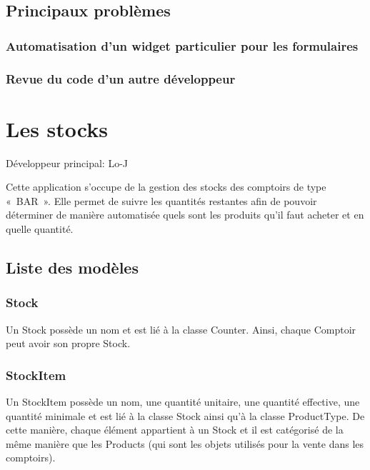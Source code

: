 \documentclass[a4paper]{report}
\begin{document}
\section{Principaux problèmes}
\label{sec:principaux_problemes}

\subsection{Automatisation d'un widget particulier pour les formulaires}
\label{sub:automatisation_d_un_widget_particulier_pour_les_formulaires}

\subsection{Revue du code d'un autre développeur}
\label{sub:revue_du_code_d_un_autre_developpeur}


\chapter{Les stocks}
\label{sub:les_stocks}
\par Développeur principal: Lo-J
\par Cette application s’occupe de la gestion des stocks des comptoirs de type « BAR ». Elle permet de suivre les quantités restantes afin de pouvoir déterminer de manière automatisée quels sont les produits qu’il faut acheter et en quelle quantité.

\section{Liste des modèles}
\label{sec:liste_des_modeles}

\subsection{Stock}
\par Un Stock possède un nom et est lié à la classe Counter. Ainsi, chaque Comptoir peut avoir son propre Stock.

\subsection{StockItem}
\par Un StockItem possède un nom, une quantité unitaire, une quantité effective, une quantité minimale et est lié à la classe Stock ainsi qu’à la classe ProductType. De cette manière, chaque élément appartient à un Stock et il est catégorisé de la même manière que les Products (qui sont les objets utilisés pour la vente dans les comptoirs).
\end{document}
